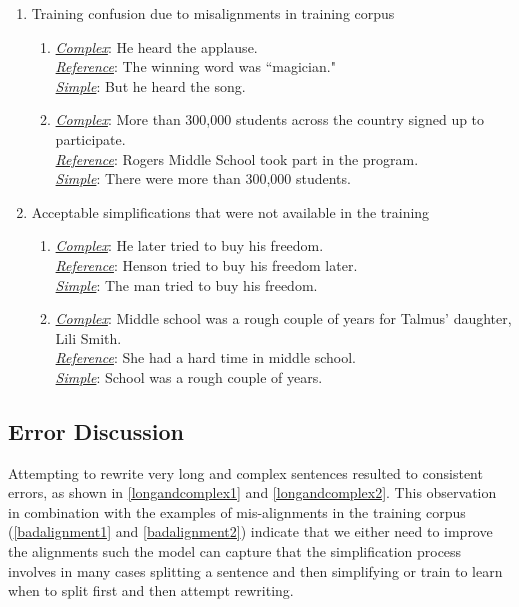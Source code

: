 \documentclass[11pt,a4paper]{article}
\begin{document}
\begin{enumerate}
\item{Training confusion due to misalignments in training corpus}
\begin{enumerate}
\small
\item {\label{badalignment1}} \underline{\it Complex}: He heard the applause.\\
\underline{\it Reference}: The winning word was ``magician."\\
\underline{\it Simple}: But he heard the song.

\item{\label{badalignment2}} \underline{\it Complex}: More than 300,000 students across the country signed up to participate. \\
\underline{\it Reference}: Rogers Middle School took part in the program.\\
\underline{\it Simple}: There were more than 300,000 students.
\end{enumerate}

\item{Acceptable simplifications that were not available in the training}
\begin{enumerate}
\small
\item{\label{acceptable1}} \underline{\it Complex}: He later tried to buy his freedom.\\
\underline{\it Reference}: Henson tried to buy his freedom later. \\
\underline{\it Simple}: The man tried to buy his freedom.

\item{\label{acceptable2}} \underline{\it Complex}: Middle school was a rough couple of years for Talmus' daughter, Lili Smith. \\
\underline{\it Reference}: She had a hard time in middle school.\\
\underline{\it Simple}: School was a rough couple of years.
\end{enumerate}
\end{enumerate}

\subsection{Error Discussion}

Attempting to rewrite very long and complex sentences resulted to consistent errors, as shown in \ref{longandcomplex1} and \ref{longandcomplex2}. This observation in combination with the examples of mis-alignments in the training corpus (\ref{badalignment1} and \ref{badalignment2}) indicate that we either need to improve the alignments such the model can capture that the simplification process involves in many cases splitting a sentence and then simplifying or train to learn when to split first and then attempt rewriting. 
\end{document}
